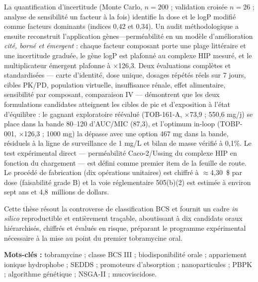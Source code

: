 La quantification d'incertitude (Monte Carlo, $n=200$ ; validation croisée $n=26$ ; analyse de sensibilité un facteur à la fois) identifie la dose et le logP modifié comme facteurs dominants (indices 0,42 et 0,34). Un audit méthodologique a ensuite reconstruit l'application gènes---perméabilité en un modèle d'amélioration \emph{cité, borné et émergent} : chaque facteur composant porte une plage littéraire et une incertitude graduée, le gène logP est plafonné au complexe HIP mesuré, et le multiplicateur émergent plafonne à $\times$126,3. Deux évaluations complètes et standardisées --- carte d'identité, dose unique, dosages répétés réels sur 7 jours, cibles PK/PD, population virtuelle, insuffisance rénale, effet alimentaire, sensibilité par composant, comparaison IV --- démontrent que les deux formulations candidates atteignent les cibles de pic et d'exposition à l'état d'équilibre : le gagnant exploratoire réévalué (TOB-161-A, $\times$73,9 ; 550,6 mg/j) se place dans la bande 80--120 d'AUC/MIC (87,3), et l'optimum in-loop (TOBP-001, $\times$126,3 ; 1000 mg) la dépasse avec une option 467 mg dans la bande, résiduels à la ligne de surveillance de 1 mg/L et bilan de masse vérifié à 0,1\%. Le test expérimental direct --- perméabilité Caco-2/Ussing du complexe HIP en fonction du chargement --- est défini comme premier item de la feuille de route. Le procédé de fabrication (dix opérations unitaires) est chiffré à $\approx$4,30~\$ par dose (faisabilité grade B) et la voie réglementaire 505(b)(2) est estimée à environ sept ans et 4,8~millions de dollars.

Cette thèse résout la controverse de classification BCS et fournit un cadre \textit{in silico} reproductible et entièrement traçable, aboutissant à dix candidats oraux hiérarchisés, chiffrés et évalués en risque, préparant le programme expérimental nécessaire à la mise au point du premier tobramycine oral.

\bigskip
\noindent\textbf{Mots-clés :} tobramycine ; classe BCS III ; biodisponibilité orale ; appariement ionique hydrophobe ; SEDDS ; promoteurs d'absorption ; nanoparticules ; PBPK ; algorithme génétique ; NSGA-II ; mucoviscidose.

